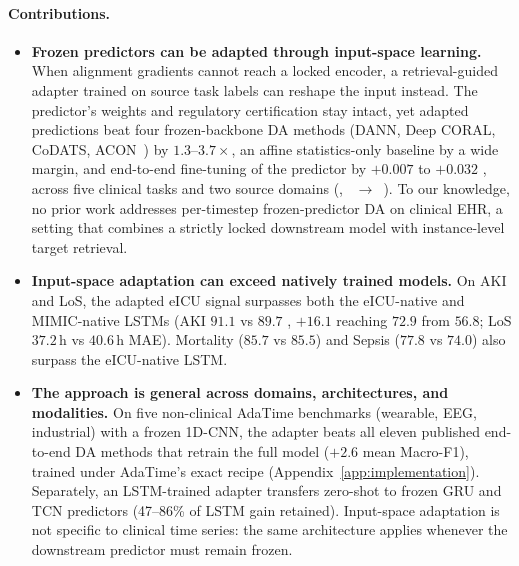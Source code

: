 \paragraph{Contributions.}
\vspace{-0.3em}
\begin{itemize}[nosep,leftmargin=*]
    \item \textbf{Frozen predictors can be adapted through input-space learning.}
    When alignment gradients cannot reach a locked encoder, a retrieval-guided adapter trained on source task labels can reshape the input instead.
    The predictor's weights and regulatory certification stay intact, yet adapted predictions beat four frozen-backbone DA methods (DANN, Deep CORAL, CoDATS, ACON~\citep{liu2024acon}) by $1.3$--$3.7\times$, an affine statistics-only baseline by a wide margin, and end-to-end fine-tuning of the predictor by $+0.007$ to $+0.032$ \aucroc{}, across five clinical tasks and two source domains (\eicu{}, \hirid{}~$\to$~\mimic{}).
    To our knowledge, no prior work addresses per-timestep frozen-predictor DA on clinical EHR, a setting that combines a strictly locked downstream model with instance-level target retrieval.

    \item \textbf{Input-space adaptation can exceed natively trained models.}
    On AKI and LoS, the adapted eICU signal surpasses both the eICU-native and MIMIC-native LSTMs (AKI $91.1$ vs $89.7$ \aucroc{}, $+16.1$ \aucpr{} reaching $72.9$ from $56.8$; LoS $37.2$\,h vs $40.6$\,h MAE). Mortality ($85.7$ vs $85.5$) and Sepsis ($77.8$ vs $74.0$) also surpass the eICU-native LSTM.

    \item \textbf{The approach is general across domains, architectures, and modalities.}
    On five non-clinical AdaTime benchmarks (wearable, EEG, industrial) with a frozen 1D-CNN, the adapter beats all eleven published end-to-end DA methods that retrain the full model ($+2.6$ mean Macro-F1), trained under AdaTime's exact recipe (Appendix~\ref{app:implementation}).
    Separately, an LSTM-trained adapter transfers zero-shot to frozen GRU and TCN predictors (47--86\% of LSTM gain retained).
    Input-space adaptation is not specific to clinical time series: the same architecture applies whenever the downstream predictor must remain frozen.
\end{itemize}
